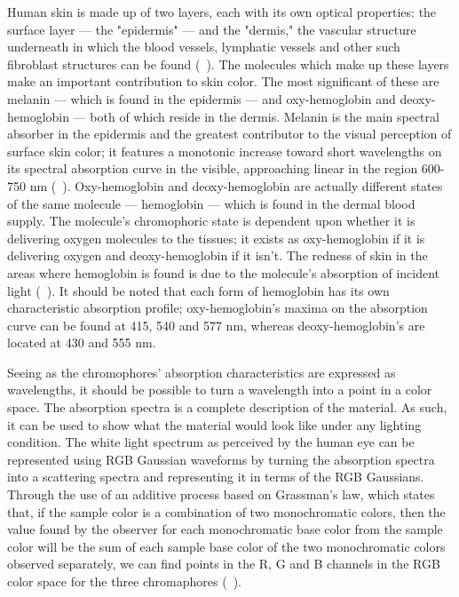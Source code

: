 Human skin is made up of two layers, each with its own optical properties: the surface layer --- the "epidermis" --- and the "dermis," the vascular structure underneath in which the blood vessels, lymphatic vessels and other such fibroblast structures can be found (~\cite{Stamatas2004}). The molecules which make up these layers make an important contribution to skin color. The most significant of these are melanin --- which is found in the epidermis --- and oxy-hemoglobin and deoxy-hemoglobin --- both of which reside in the dermis. Melanin is the main spectral absorber in the epidermis and the greatest contributor to the visual perception of surface skin color; it features a monotonic increase toward short wavelengths on its spectral absorption curve in the visible, approaching linear in the region 600-750 nm (~\cite{Stamatas2004,Kollias1995,Zonios2001}). Oxy-hemoglobin and deoxy-hemoglobin are actually different states of the same molecule --- hemoglobin --- which is found in the dermal blood supply. The molecule's chromophoric state is dependent upon whether it is delivering oxygen molecules to the tissues; it exists as oxy-hemoglobin if it is delivering oxygen and deoxy-hemoglobin if it isn't. The redness of skin in the areas where hemoglobin is found is due to the molecule's absorption of incident light (~\cite{Kollias1995}). It should be noted that each form of hemoglobin has its own characteristic absorption profile; oxy-hemoglobin's maxima on the absorption curve can be found at 415, 540 and 577 nm, whereas deoxy-hemoglobin's are located at 430 and 555 nm.

Seeing as the chromophores' absorption characteristics are expressed as wavelengths, it should be possible to turn a wavelength into a point in a color space. The absorption spectra is a complete description of the material. As such, it can be used to show what the material would look like under any lighting condition. The white light spectrum as perceived by the human eye can be represented using RGB Gaussian waveforms by turning the absorption spectra into a scattering spectra and representing it in terms of the RGB Gaussians. Through the use of an additive process based on Grassman's law, which states that, if the sample color is a combination of two monochromatic colors, then the value found by the observer for each monochromatic base color from the sample color will be the sum of each sample base color of the two monochromatic colors observed separately, we can find points in the R, G and B channels in the RGB color space for the three chromaphores (~\cite{MIHAI2007}).

